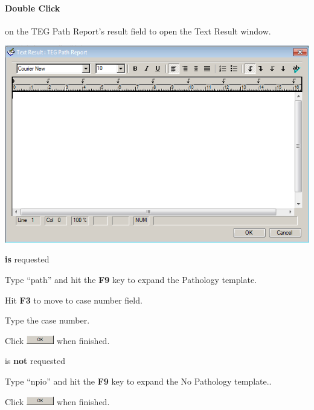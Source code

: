 \paragraph{Double Click } on the TEG Path Report's result field to open the Text Result window.\\
\vspace{.5em}
\begin{minipage}{\textwidth}
  \includegraphics[width=.8\textwidth, trim={0, 0px, 0, 0}, clip]{graphics/text_result}
\end{minipage}

 \textbf{is} requested\\
\begin{description}
      \item Type ``path'' and hit the \textbf{F9} key to expand the Pathology template.
      \item Hit \textbf{F3} to move to case number field.
      \item Type the case number.
      \item Click \includegraphics[height=1em]{graphics/ok_button.png}  when finished.
\end{description}
\clearpage
{} is \textbf{not} requested\\
\begin{description}
      \item Type ``npio'' and hit the \textbf{F9} key to expand the No Pathology template..
      \item Click \includegraphics[height=1em]{graphics/ok_button.png}  when finished.
\end{description}

